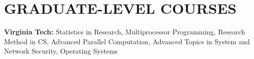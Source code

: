 \section{GRADUATE-LEVEL COURSES}
\vspace{0.07in}
{\bf Virginia Tech:} Statistics in Research, Multiprocessor Programming,
Research Method in CS, Advanced Parallel Computation, Advanced Topics in System
and Network Security, Operating Systems

